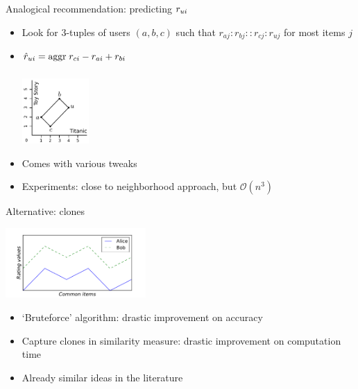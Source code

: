 \documentclass{beamer}
\begin{document}
\begin{frame}{Analogical recommendation: predicting $r_{ui}$}
  \begin{itemize}
    \item Look for $3$-tuples of users $(a, b, c)$ such that $r_{aj}: r_{bj} ::
      r_{cj} : r_{uj}$ for most items $j$
    \item $\hat{r}_{ui} = \underset{}{\operatorname{aggr}}\; r_{ci} - r_{ai} + r_{bi}$
    \begin{center}
      \includegraphics[width=0.2\textwidth]{figures/analogical_recommendation.pdf}
    \end{center}
  \item Comes with various tweaks
  \item Experiments: close to neighborhood approach, but $\mathcal{O}(n^3)$
  \end{itemize}
\end{frame}

\begin{frame}{Alternative: clones}
    \begin{center}
      \includegraphics[width=0.4\textwidth]{figures/clones.pdf}
    \end{center}
    \begin{itemize}
      \item `Bruteforce' algorithm: drastic improvement on accuracy
      \item Capture clones in similarity measure: drastic improvement on
        computation time
      \item Already similar ideas in the literature
    \end{itemize}
\end{frame}
\end{document}
